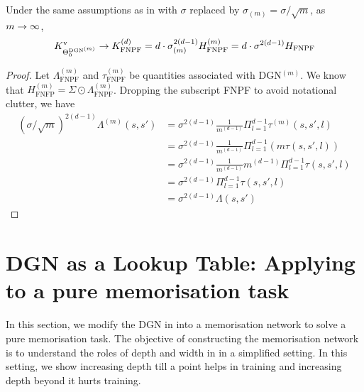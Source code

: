 \begin{appendix}
\begin{corollary} Under the same assumptions as in  with $\sigma$ replaced by $\sigma_{(m)}=\sigma/\sqrt{m}$, as $m\rightarrow\infty$, \begin{align*}K^{\text{v}}_{\Theta^{\text{DGN}^{(m)}}_0}\rightarrow K^{(d)}_{\text{FNPF}} = d\cdot \sigma_{(m)}^{2(d-1)} H^{(m)}_{\text{FNPF}}= d\cdot \sigma^{2(d-1)} H_{\text{FNPF}}\end{align*}
\end{corollary}
\begin{proof}
Let $\Lambda^{(m)}_{\text{FNPF}}$ and $\tau^{(m)}_{\text{FNPF}}$ be quantities associated with DGN${}^{(m)}$. We know that  $H^{(m)}_{\text{FNFP}}=\Sigma\odot\Lambda^{(m)}_{\text{FNPF}}$. Dropping the subscript FNPF to avoid notational clutter, we have
\begin{align*}
\left(\sigma/\sqrt{m}\right)^{2(d-1)}\Lambda^{(m)}(s,s')&=\sigma^{2(d-1)}\frac{1}{m^{(d-1)}}\Pi_{l=1}^{d-1}\tau^{(m)}(s,s',l)\\
&=\sigma^{2(d-1)}\frac{1}{m^{(d-1)}}\Pi_{l=1}^{d-1}\left(m \tau(s,s',l)\right)\\
&=\sigma^{2(d-1)}\frac{1}{m^{(d-1)}}m^{(d-1)}\Pi_{l=1}^{d-1} \tau(s,s',l)\\
&=\sigma^{2(d-1)}\Pi_{l=1}^{d-1} \tau(s,s',l)\\
&=\sigma^{2(d-1)}\Lambda(s,s')
\end{align*}
\end{proof}


\section{DGN as a Lookup Table: Applying  to a pure memorisation task}\label{sec:mem}

In this section, we modify the DGN in  into a memorisation network to solve a pure memorisation task. The objective of constructing the memorisation network is to understand the roles of depth and width in  in a simplified setting. In this setting, we show increasing depth till a point helps in training and increasing depth beyond it hurts training. 


\end{appendix}
